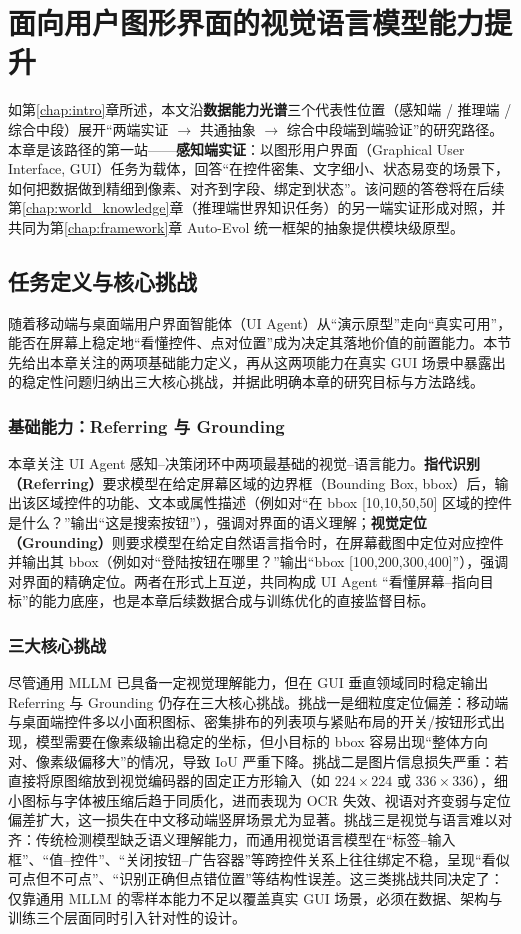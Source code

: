 \chapter{面向用户图形界面的视觉语言模型能力提升}
\label{chap:gui}

如第\ref{chap:intro}章所述，本文沿\textbf{数据能力光谱}三个代表性位置（感知端 / 推理端 / 综合中段）展开“两端实证 $\rightarrow$ 共通抽象 $\rightarrow$ 综合中段端到端验证”的研究路径。本章是该路径的第一站——\textbf{感知端实证}：以图形用户界面（Graphical User Interface, GUI）任务为载体，回答“在控件密集、文字细小、状态易变的场景下，如何把数据做到精细到像素、对齐到字段、绑定到状态”。该问题的答卷将在后续第\ref{chap:world_knowledge}章（推理端世界知识任务）的另一端实证形成对照，并共同为第\ref{chap:framework}章 Auto-Evol 统一框架的抽象提供模块级原型。

\section{任务定义与核心挑战}
随着移动端与桌面端用户界面智能体（UI Agent）从“演示原型”走向“真实可用”，能否在屏幕上稳定地“看懂控件、点对位置”成为决定其落地价值的前置能力。本节先给出本章关注的两项基础能力定义，再从这两项能力在真实 GUI 场景中暴露出的稳定性问题归纳出三大核心挑战，并据此明确本章的研究目标与方法路线。

\subsection{基础能力：Referring 与 Grounding}
本章关注 UI Agent 感知--决策闭环中两项最基础的视觉--语言能力。\textbf{指代识别（Referring）}要求模型在给定屏幕区域的边界框（Bounding Box, bbox）后，输出该区域控件的功能、文本或属性描述（例如对“在 bbox [10,10,50,50] 区域的控件是什么？”输出“这是搜索按钮”），强调对界面的语义理解；\textbf{视觉定位（Grounding）}则要求模型在给定自然语言指令时，在屏幕截图中定位对应控件并输出其 bbox（例如对“登陆按钮在哪里？”输出“bbox [100,200,300,400]”），强调对界面的精确定位。两者在形式上互逆，共同构成 UI Agent “看懂屏幕--指向目标”的能力底座，也是本章后续数据合成与训练优化的直接监督目标。

\subsection{三大核心挑战}
尽管通用 MLLM 已具备一定视觉理解能力，但在 GUI 垂直领域同时稳定输出 Referring 与 Grounding 仍存在三大核心挑战。挑战一是细粒度定位偏差：移动端与桌面端控件多以小面积图标、密集排布的列表项与紧贴布局的开关/按钮形式出现，模型需要在像素级输出稳定的坐标，但小目标的 bbox 容易出现“整体方向对、像素级偏移大”的情况，导致 IoU 严重下降。挑战二是图片信息损失严重：若直接将原图缩放到视觉编码器的固定正方形输入（如 $224\times224$ 或 $336\times336$），细小图标与字体被压缩后趋于同质化，进而表现为 OCR 失效、视语对齐变弱与定位偏差扩大，这一损失在中文移动端竖屏场景尤为显著。挑战三是视觉与语言难以对齐：传统检测模型缺乏语义理解能力，而通用视觉语言模型在“标签--输入框”、“值--控件”、“关闭按钮--广告容器”等跨控件关系上往往绑定不稳，呈现“看似可点但不可点”、“识别正确但点错位置”等结构性误差。这三类挑战共同决定了：仅靠通用 MLLM 的零样本能力不足以覆盖真实 GUI 场景，必须在数据、架构与训练三个层面同时引入针对性的设计。

